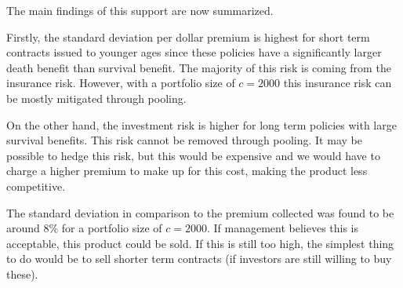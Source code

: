 \documentclass[12pt]{article}
\begin{document}
The main findings of this support are now summarized.

Firstly, the standard deviation per dollar premium is highest for short term contracts issued to younger ages since these policies have a significantly larger death benefit than survival benefit. The majority of this risk is coming from the insurance risk. However, with a portfolio size of $c = 2000$ this insurance risk can be mostly mitigated through pooling.

On the other hand, the investment risk is higher for long term policies with large survival benefits. This risk cannot be removed through pooling. It may be possible to hedge this risk, but this would be expensive and we would have to charge a higher premium to make up for this cost, making the product less competitive.

The standard deviation in comparison to the premium collected was found to be around 8\% for a portfolio size of $c = 2000$. If management believes this is acceptable, this product could be sold. If this is still too high, the simplest thing to do would be to sell shorter term contracts (if investors are still willing to buy these).

\newpage
\end{document}
